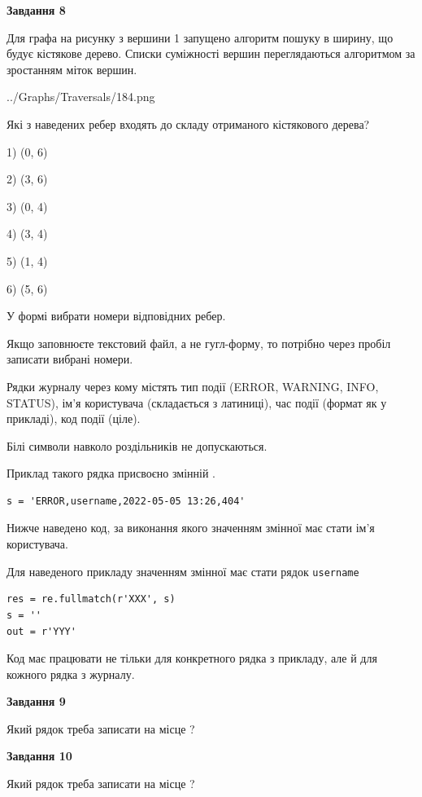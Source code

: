 \documentclass[12pt, ukrainian]{article}
\def\code#1{\Verb!#1!}
\begin{document}
{\begin {large}
{\begin {center}\textbf{Завдання 8}\end {center}}\par
Для графа на рисунку з вершини 1 запущено алгоритм пошуку в ширину, що будує кістякове дерево. Списки суміжності вершин переглядаються алгоритмом за зростанням міток вершин.\par
\begin{center}
	{../Graphs/Traversals/184.png}
\end{center}
\par Які з наведених ребер входять до складу отриманого кістякового дерева?\par
1) (0, 6)\par
2) (3, 6)\par
3) (0, 4)\par
4) (3, 4)\par
5) (1, 4)\par
6) (5, 6)\par
{\vskip 15pt} У формі вибрати номери відповідних ребер.


Якщо заповнюєте текстовий файл, а не гугл-форму, то потрібно через пробіл записа\-ти вибрані номери.\par
\newpage


Рядки журналу через кому містять тип події (ERROR, WARNING, INFO, STATUS), ім'я користувача (складається з латиниці), час події (фор\-мат як у прикладі), код події (ціле).

Білі символи навколо роздільників не допускаються.

Приклад такого рядка присвоєно змінній .



\begin{verbatim}
s = 'ERROR,username,2022-05-05 13:26,404'
\end{verbatim}


Нижче наведено код, за виконання якого значенням змінної  має стати ім'я користувача.

Для наведеного прикладу значенням змінної  має стати рядок \code{username}



\begin{verbatim}
res = re.fullmatch(r'XXX', s)
s = ''
out = r'YYY'
\end{verbatim}


Код має працювати не тільки для конкретного рядка з прикладу, але й для кожного рядка з журналу.

{\begin {center}\textbf{Завдання 9}\end {center}}\par
Який рядок треба записати на місце  ?\par
\vspace{5mm}


{\begin {center}\textbf{Завдання 10}\end {center}}\par
Який рядок треба записати на місце  ?\par


\newpage


\end {large}}
\end{document}
